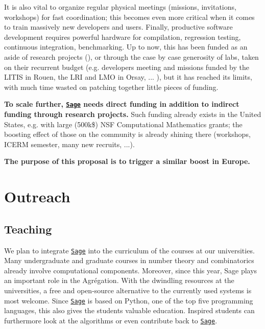 \documentclass[a4,12pt]{amsart}
\newcommand{\sage}{\href{http://www.sagemath.org/}{\texttt{Sage}}\xspace}
\newcommand{\TODO}[2][To do: ]{}
\begin{document}
It is also vital to organize regular physical meetings (missions,
invitations, workshops) for fast coordination; this becomes even more
critical when it comes to train massively new developers and users.
Finally, productive software development requires powerful hardware for
compilation, regression testing, continuous integration,
benchmarking.
%
Up to now, this has been funded as an aside of research
projects (\TODO{cite them}), or through the case by case generosity of
labs, taken on their recurrent budget (e.g. developers meeting and
missions funded by the LITIS in Rouen, the LRI and LMO in Orsay,
... \TODO{expand to the European scale}), but it has reached its
limits, with much time wasted on patching together little pieces of
funding.
%



\textbf{To scale further, \sage{} needs direct funding in addition to
  indirect funding through research projects.} Such funding already
exists in the United States, e.g. with large (500k\$) NSF
Computational Mathematics grants; the boosting effect of those on the
community is already shining there (workshops, ICERM semester, many
new recruits, ...).

\medskip
\textbf{The purpose of this proposal is to trigger a similar boost in
  Europe.}

\section{Outreach}

\TODO{Insert this somewhere: Dissemination: Sharing code increases our
  visibility, spreads our research results to other scientific areas,
  and benefits education.}

\subsection{Teaching}

We plan to integrate \sage{} into the curriculum of the courses at our
universities. Many undergraduate and graduate courses in number theory
and combinatorics already involve computational components. Moreover,
since this year, Sage plays an important role in the Agrégation. With
the dwindling resources at the universities, a free and open-source
alternative to the currently used systems %
is most welcome. Since \sage{} is based on Python, one of the top five
programming languages, this also gives the students valuable
education.  Inspired students can furthermore look at the algorithms
or even contribute back to \sage{}.
\end{document}
